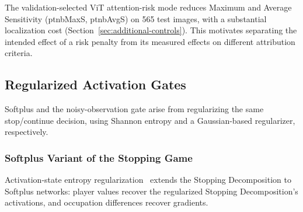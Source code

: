 \begin{changed}The validation-selected ViT attention-risk mode reduces Maximum and Average Sensitivity (\acs{ptnbMaxS}, \acs{ptnbAvgS}) on 565 test images, with a substantial localization cost (Section~\ref{sec:additional-controls}). This motivates separating the intended effect of a risk penalty from its measured effects on different attribution criteria.\end{changed}

\subsection{Regularized Activation Gates}\label{ptnb:app:regularized-gates}

Softplus and the noisy-observation gate arise from regularizing the same stop/continue decision, using Shannon entropy and a Gaussian-based regularizer, respectively.

\subsubsection{Softplus Variant of the Stopping Game}\label{ptnb:app:softplus-stopping-game}

Activation-state entropy regularization~\parencite{Gaubert2025} extends the Stopping Decomposition
to Softplus networks: player values recover the regularized Stopping Decomposition's activations, and occupation differences recover
gradients.

